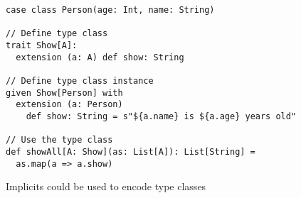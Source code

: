 \begin{algorithm}
\begin{verbatim}
case class Person(age: Int, name: String)

// Define type class
trait Show[A]:
  extension (a: A) def show: String

// Define type class instance
given Show[Person] with
  extension (a: Person)
    def show: String = s"${a.name} is ${a.age} years old"

// Use the type class
def showAll[A: Show](as: List[A]): List[String] =
  as.map(a => a.show)
\end{verbatim}

\caption{Implicits could be used to encode type classes \label{scala:typeclasses}}
\end{algorithm}